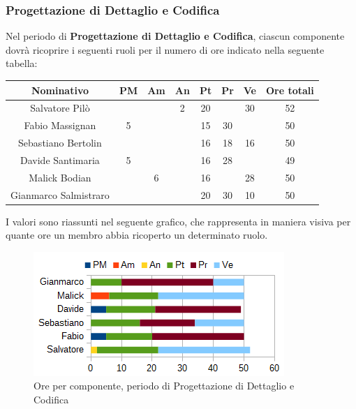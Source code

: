 		\subsubsection{Progettazione di Dettaglio e Codifica}
		Nel periodo di \textbf{Progettazione di Dettaglio e Codifica}, ciascun componente dovrà ricoprire i seguenti ruoli per il numero di ore indicato nella seguente tabella: \\
		\begin{table}[H]
		\centering
		\begin{tabular}{|c|c|c|c|c|c|c|c|}
			\hline
			\textbf{Nominativo}		& \textbf{PM}	& \textbf{Am}	& \textbf{An}	& \textbf{Pt}	& \textbf{Pr}	& \textbf{Ve}	& \textbf{Ore totali}     \\
			\hline
			Salvatore Pilò			& 		& 		& 2		& 20	&		& 30	& 52 \\
			Fabio Massignan			& 5		& 		&		& 15	& 30	& 		& 50 \\
			Sebastiano Bertolin		&		& 		& 		& 16	& 18	& 16	& 50 \\
			Davide Santimaria		& 5		& 		& 		& 16	& 28	&		& 49 \\
			Malick Bodian			& 		& 6		&		& 16	&		& 28	& 50 \\
			Gianmarco Salmistraro	&		& 		& 		& 20	& 30	& 10	& 50 \\
			\hline
		\end{tabular}
		\end{table}
		I valori sono riassunti nel seguente grafico, che rappresenta in maniera visiva per quante ore un membro abbia ricoperto un determinato ruolo. \\
		\begin{figure}[H]
			\centering
			\includegraphics[width=1\linewidth]{immagini/grafici/progettazione_dettaglio_codifica-barra.png}
			\caption{Ore per componente, periodo di Progettazione di Dettaglio e Codifica}
		\end{figure}
